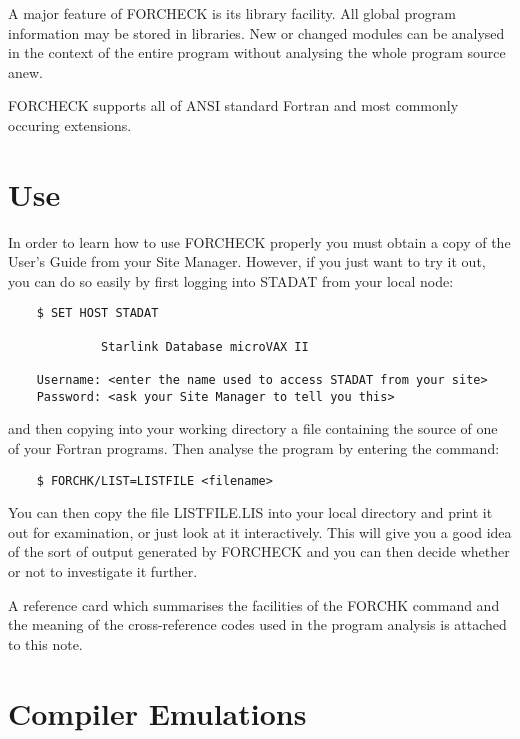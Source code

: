 A major feature of FORCHECK is its library facility.
All global program information may be stored in libraries.
New or changed modules can be analysed in the context of the entire program
without analysing the whole program source anew.

FORCHECK supports all of ANSI standard Fortran and most commonly occuring
extensions.

\section{Use}

In order to learn how to use FORCHECK properly you must obtain a copy of the
User's Guide from your Site Manager.
However, if you just want to try it out, you can do so easily by first logging
into STADAT from your local node:
\begin{verbatim}
    $ SET HOST STADAT

             Starlink Database microVAX II

    Username: <enter the name used to access STADAT from your site>
    Password: <ask your Site Manager to tell you this>
\end{verbatim}
and then copying into your working directory a file containing the source of
one of your Fortran programs.
Then analyse the program by entering the command:
\begin{verbatim}
    $ FORCHK/LIST=LISTFILE <filename>
\end{verbatim}
You can then copy the file LISTFILE.LIS into your local directory and print it
out for examination, or just look at it interactively.
This will give you a good idea of the sort of output generated by FORCHECK
and you can then decide whether or not to investigate it further.

A reference card which summarises the facilities of the FORCHK command and
the meaning of the cross-reference codes used in the program analysis is
attached to this note.

\section{Compiler Emulations}


